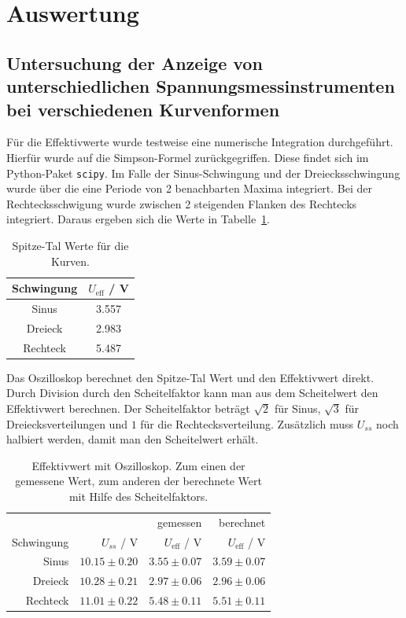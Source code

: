 \documentclass{article}
\begin{document}
\section{Auswertung}

\subsection{Untersuchung  der  Anzeige  von  unterschiedlichen  Spannungsmessinstrumenten  bei verschiedenen Kurvenformen }





Für die Effektivwerte wurde testweise eine numerische Integration durchgeführt. Hierfür wurde auf die Simpson-Formel zurückgegriffen. Diese findet sich im Python-Paket \texttt{scipy}. Im Falle der Sinus-Schwingung und der Dreiecksschwingung wurde über die eine Periode von 2 benachbarten Maxima integriert. Bei der Rechtecksschwigung wurde zwischen 2 steigenden Flanken des Rechtecks integriert. Daraus ergeben sich die Werte in Tabelle~\ref{tab:task1_num_int}.
\begin{table}[H]
\caption{Spitze-Tal Werte für die Kurven.}
\label{tab:task1_num_int}
\begin{tabular}{c|c}
Schwingung &  $U_\text{eff}$ / V  \\
\hline
Sinus &  3.557 \\
Dreieck & 2.983 \\
Rechteck & 5.487
\end{tabular}
\end{table}



Das Oszilloskop berechnet den Spitze-Tal Wert und den Effektivwert direkt. Durch Division durch den Scheitelfaktor kann man aus dem Scheitelwert den Effektivwert berechnen. Der Scheitelfaktor beträgt $\sqrt{2}$ für Sinus, $\sqrt{3}$ für Dreiecksverteilungen und $1$ für die Rechtecksverteilung. Zusätzlich muss $U_{ss}$ noch halbiert werden, damit man den Scheitelwert erhält.

\begin{table}[H]
\centering
\caption{Effektivwert mit Oszilloskop. Zum einen der gemessene Wert, zum anderen der berechnete Wert mit Hilfe des Scheitelfaktors.}
\label{tab:auswertung_task1_oszi}
\begin{tabular}{r|rrr}
 & & gemessen & berechnet \\
 Schwingung &  $U_{ss}$ / V &  $U_\text{eff}$ / V  &  $U_\text{eff}$ / V\\
\hline
Sinus & $10.15 \pm 0.20$ & $3.55 \pm 0.07$ & $3.59 \pm 0.07$ \\
Dreieck & $10.28 \pm 0.21$ & $2.97 \pm 0.06$ & $2.96 \pm 0.06$ \\
Rechteck & $11.01 \pm 0.22$ & $5.48 \pm 0.11$ & $5.51 \pm 0.11$
\end{tabular}
\end{table}
\end{document}
